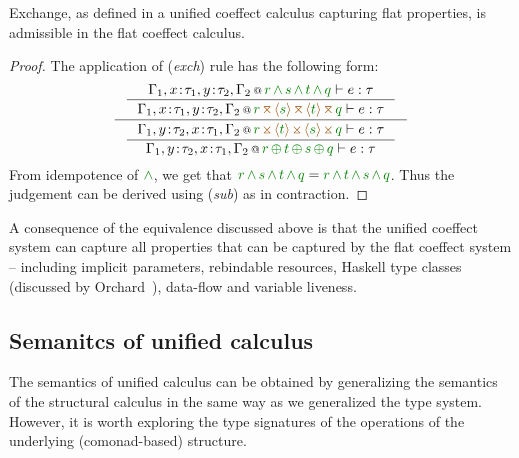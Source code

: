 \begin{lemma}
\label{thm:unified-rev-exch}
Exchange, as defined in a unified coeffect calculus capturing flat properties, is admissible in 
the flat coeffect calculus.
\end{lemma}
\begin{proof}
The application of (\emph{exch}) rule has the following form:
\begin{equation*}
\inference
 {\inference
    {\coctx{\Gamma_1,x\!:\!\tau_1,y\!:\!\tau_2,\Gamma_2}{\cclrd{r} \,\czip\, \cclrd{s} \,\czip\, \cclrd{t} \,\czip\, \cclrd{q}} \vdash e : \tau}
    {\coctx{\Gamma_1,x\!:\!\tau_1,y\!:\!\tau_2,\Gamma_2}{\cclrd{r} \,\azip\, \alift{\cclrd{s}} \,\azip\, \alift{\cclrd{t}} \,\azip\, \cclrd{q}} \vdash e : \tau} }
 {\inference
    {\coctx{\Gamma_1,y\!:\!\tau_2,x\!:\!\tau_1,\Gamma_2}{\cclrd{r} \,\apar\, \alift{\cclrd{t}} \,\apar\, \alift{\cclrd{s}} \,\apar\, \cclrd{q}} \vdash e : \tau}
    {\coctx{\Gamma_1,y\!:\!\tau_2,x\!:\!\tau_1,\Gamma_2}{\cclrd{r} \,\cpar\, \cclrd{t} \,\cpar\, \cclrd{s} \,\cpar\, \cclrd{q}} \vdash e : \tau} }
\end{equation*}
%
From idempotence of $\czip$, we get that $\cclrd{r} \,\czip\, \cclrd{s} \,\czip\, \cclrd{t} \,\czip\, \cclrd{q} =
\cclrd{r} \,\czip\, \cclrd{t} \,\czip\, \cclrd{s} \,\czip\, \cclrd{q}$. Thus the judgement can be derived using
(\emph{sub}) as in contraction.
\end{proof}

\noindent
A consequence of the equivalence discussed above is that the unified coeffect system can capture 
all properties that can be captured by the flat coeffect system -- including implicit parameters,
rebindable resources, Haskell type classes (discussed by Orchard~\cite{comonads-dom-thesis}),
data-flow and variable liveness.


\subsection{Semanitcs of unified calculus}
\label{sec:unified-semantics}

The semantics of unified calculus can be obtained by generalizing the semantics of the structural
calculus in the same way as we generalized the type system. However, it is worth exploring the type 
signatures of the operations of the underlying (comonad-based) structure.

